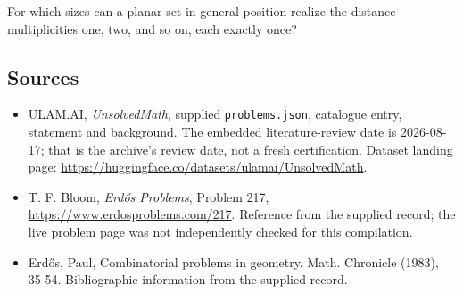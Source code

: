 \documentclass[11pt,a4paper]{article}
\begin{document}
For which sizes can a planar set in general position realize the distance multiplicities one, two, and so on, each exactly once?

\subsection{Sources}

{\small

\begin{itemize}

\item[\hypertarget{source:statement:1}{S1}] ULAM.AI, \emph{UnsolvedMath}, supplied \texttt{problems.json}, catalogue entry, statement and background. The embedded literature-review date is 2026-08-17; that is the archive’s review date, not a fresh certification. Dataset landing page: \url{https://huggingface.co/datasets/ulamai/UnsolvedMath}.

\item[\hypertarget{source:statement:2}{S2}] T. F. Bloom, \emph{Erdős Problems}, Problem 217, \url{https://www.erdosproblems.com/217}. Reference from the supplied record; the live problem page was not independently checked for this compilation.

\item[\hypertarget{source:statement:3}{S3}] Erd\H{o}s, Paul, Combinatorial problems in geometry. Math. Chronicle (1983), 35-54. Bibliographic information from the supplied record.

\end{itemize}

}

\label{end:statement}
\end{document}
